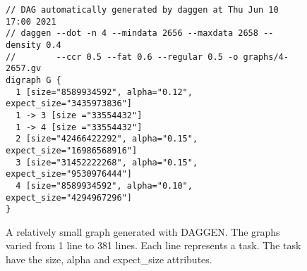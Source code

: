 \begin{figure}[htp!]
    \centering
    \caption{A relatively small graph generated with DAGGEN. The graphs varied
    from 1 line to 381 lines. Each line represents a task. The task have the
    size, alpha and expect\_size attributes.}
    \label{fig:dag}
    \vspace{-.5cm}
    \begin{Verbatim}[frame=single]
// DAG automatically generated by daggen at Thu Jun 10 17:00 2021
// daggen --dot -n 4 --mindata 2656 --maxdata 2658 --density 0.4
//        --ccr 0.5 --fat 0.6 --regular 0.5 -o graphs/4-2657.gv
digraph G {
  1 [size="8589934592", alpha="0.12", expect_size="3435973836"]
  1 -> 3 [size ="33554432"]
  1 -> 4 [size ="33554432"]
  2 [size="42466422292", alpha="0.15", expect_size="16986568916"]
  3 [size="31452222268", alpha="0.15", expect_size="9530976444"]
  4 [size="8589934592", alpha="0.10", expect_size="4294967296"]
}
    \end{Verbatim}
\end{figure}
